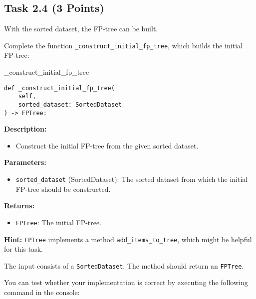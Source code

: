 \documentclass[
english,
smallborders
]{i6prcsht}
\newcommand{\points}[1]{\hfill \color{red}(#1 Points)\color{black}}
\begin{document}
\newpage

\subsection*{Task 2.4 \points{3}}

With the sorted dataset, the FP-tree can be built.

Complete the function \texttt{\_construct\_initial\_fp\_tree}, which builds the
initial FP-tree:

\vspace*{0.3cm}

\begin{functionbox}{\_construct\_initial\_fp\_tree}
	\begin{lstlisting}[numbers=none]
def _construct_initial_fp_tree(
    self, 
    sorted_dataset: SortedDataset
) -> FPTree:
\end{lstlisting}
	
	\textbf{Description:}
	\begin{itemize}[leftmargin=*,topsep=0pt]
		\item Construct the initial FP-tree from the given sorted dataset.
	\end{itemize}
	
	\textbf{Parameters:}
	\begin{itemize}[leftmargin=*,topsep=0pt]
		\item \texttt{sorted\_dataset} (SortedDataset): The sorted dataset from which the initial FP-tree should be constructed.
	\end{itemize}
	
	\textbf{Returns:}
	\begin{itemize}[leftmargin=*,topsep=0pt]
		\item \texttt{FPTree}: The initial FP-tree.
	\end{itemize}
	
	\textbf{Hint:} \texttt{FPTree} implements a method \texttt{add\_items\_to\_tree}, which might be helpful for this task.
\end{functionbox}

\vspace*{0.5cm}

The input consists of a \texttt{SortedDataset}. The method should return an \texttt{FPTree}.

You can test whether your implementation is correct by executing the following command in the console:

\vspace*{0.3cm}
\end{document}
